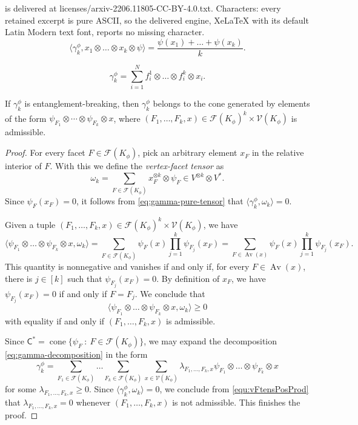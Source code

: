 \documentclass[10pt,a4paper]{amsart}
\DeclareMathOperator{\Av}{Av}
\DeclareMathOperator{\cone}{\mathrm{cone}}
\newcommand{\gC}{\mathsf{C}}
\newcommand{\st}{\ : \ }
\renewcommand{\geq}{\geqslant}
\begin{document}
is delivered at licenses/arxiv-2206.11805-CC-BY-4.0.txt. Characters: every retained excerpt is pure ASCII, so the delivered engine, XeLaTeX with its default Latin Modern text font, reports no missing character.
\begin{equation} \label{eq:gamma-pure-tensor} \langle \gamma_k^\phi, x_1 \otimes \dots \otimes x_k \otimes \psi \rangle = \frac{\psi(x_1) + \dots + \psi(x_k)}{k}.\end{equation}

\begin{equation} \label{eq:gamma-decomposition} \gamma_k^\phi = \sum_{i=1}^N f_i^1 \otimes \dots \otimes f_i^k \otimes x_i. \end{equation}

\begin{lemma} \label{lemma:gamma-vs-admissible}
If $\gamma_k^\phi$ is entanglement-breaking, then $\gamma_k^\phi$ belongs to the cone generated by elements of the form $\psi_{F_1} \otimes \cdots \otimes \psi_{F_k} \otimes x$, where $(F_1, \ldots, F_k,x) \in \mathcal{F}(K_\phi)^k \times \mathcal{V}(K_\phi)$ is admissible.
\end{lemma}

\begin{proof} 
For every facet $F \in \mathcal{F}(K_\phi)$, pick an arbitrary element $x_F$ in the relative interior of $F$. With this we define the \emph{vertex-facet tensor} as
\begin{equation} \label{equ:VFTensor}
\omega_k = \sum_{F \in \mathcal{F}(K_\phi)} x_F^{\otimes k} \otimes \psi_F \in V^{\otimes k}\otimes V^* .
\end{equation}
Since $\psi_F(x_F)=0$, it follows from \eqref{eq:gamma-pure-tensor} that $\langle \gamma_k^\phi , \omega_k \rangle = 0$. 

Given a tuple $(F_1,\dots,F_k,x) \in \mathcal{F}(K_\phi)^k \times \mathcal{V}(K_\phi)$, we have 
\[ \langle \psi_{F_1} \otimes \dots \otimes \psi_{F_k} \otimes x, \omega_k \rangle 
= \sum_{F \in \mathcal{F}(K_\phi)} \psi_F(x) \prod_{j=1}^k \psi_{F_j}(x_F) 
= \sum_{F \in \Av(x)} \psi_F(x) \prod_{j=1}^k \psi_{F_j}(x_F)
.\]
This quantity is nonnegative and vanishes if and only if, for every $F \in \Av(x)$, there is $j \in [k]$ such that $\psi_{F_j}(x_F)=0$. By definition of $x_F$, we have $\psi_{F_j}(x_F)=0$ if and only if $F=F_j$. We conclude that 
\begin{equation}\label{equ:vFtensPosProd} \langle \psi_{F_1} \otimes \dots \otimes \psi_{F_k} \otimes x, \omega_k \rangle \geq 0 \end{equation}
with equality if and only if $(F_1,\dots,F_k,x)$ is admissible. 

Since $\gC^* = \cone \{ \psi_F \st F \in \mathcal{F}(K_\phi) \}$, we may expand the decomposition \eqref{eq:gamma-decomposition} in the form 
\[
\gamma_k^\phi =  \sum_{F_1 \in \mathcal{F}(K_\phi)} \dots
\sum_{F_k \in \mathcal{F}(K_\phi)} \sum_{x \in \mathcal{V}(K_\phi)} \lambda_{F_1,\dots,F_k,x} \psi_{F_1} \otimes \dots \otimes \psi_{F_k} \otimes x
\]
for some $\lambda_{F_1,\dots,F_k,x} \geq 0$. Since $\langle \gamma_k^\phi,\omega_k \rangle =0$, we conclude from \eqref{equ:vFtensPosProd} that $\lambda_{F_1,\dots,F_k,x} = 0$ whenever $(F_1,\dots,F_k,x)$ is not admissible. This finishes the proof.
\end{proof}
\end{document}
